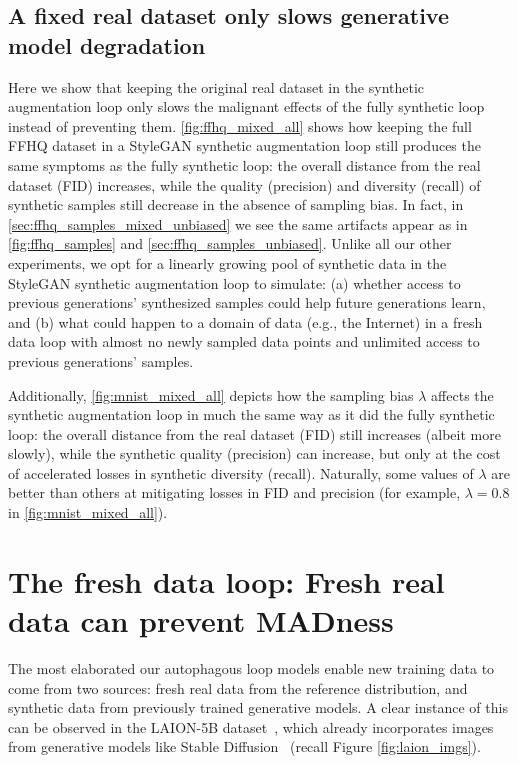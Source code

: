 \documentclass{article}
\def\bias{{\lambda}}
\def\colorSynthetic{colorA}
\def\colorMixed{colorB}
\def\colorFresh{colorC}
\def\synthetic{\textcolor{\colorSynthetic}{fully synthetic loop}}
\def\mixed{\textcolor{\colorMixed}{synthetic augmentation loop}}
\def\fresh{\textcolor{\colorFresh}{fresh data loop}}
\begin{document}
\subsection{A fixed real dataset only slows generative model degradation}


Here we show that keeping the original real dataset in the \mixed{} only slows the malignant effects of the \synthetic{} instead of preventing them. \cref{fig:ffhq_mixed_all} shows how keeping the full FFHQ dataset in a StyleGAN \mixed{} still produces the same symptoms as the \synthetic{}: the overall distance from the real dataset (FID) increases, while the quality (precision) and diversity (recall) of synthetic samples still decrease in the absence of sampling bias. In fact, in \cref{sec:ffhq_samples_mixed_unbiased} we see the same artifacts appear as in \cref{fig:ffhq_samples} and \cref{sec:ffhq_samples_unbiased}. Unlike all our other experiments, we opt for a linearly growing pool of synthetic data in the StyleGAN \mixed{} to simulate: (a) whether access to previous generations' synthesized samples could help future generations learn, and (b) what could happen to a domain of data (e.g., the Internet) in a \fresh{} with almost no newly sampled data points and unlimited access to previous generations' samples.

Additionally, \cref{fig:mnist_mixed_all} depicts how the sampling bias $\bias$ affects the \mixed{} in much the same way as it did the \synthetic{}: the overall distance from the real dataset (FID) still increases (albeit more slowly), while the synthetic quality (precision) can increase, but only at the cost of accelerated losses in synthetic diversity (recall). Naturally, some values of $\bias$ are better than others at mitigating losses in FID and precision (for example, $\bias=0.8$ in \cref{fig:mnist_mixed_all}).




\section{The \fresh{}: Fresh real data can prevent MADness}
\label{sec:fresh}

The most elaborated our autophagous loop models enable new training data to come from two sources: fresh real data from the reference distribution, and synthetic data from previously trained generative models. 
A clear instance of this can be observed in the LAION-5B dataset~\cite{laion}, which already incorporates images from generative models like Stable Diffusion~\cite{stable_diff} (recall Figure \ref{fig:laion_imgs}).
\end{document}
